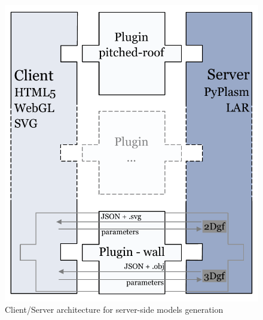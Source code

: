 \begin{figure}[htbp] %
   \centering

   \includegraphics[width=0.6\linewidth]{images/architecture-h}

   \caption{Client/Server architecture for server-side models generation}
   \label{fig:c-s-arch}
\end{figure}


